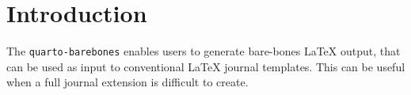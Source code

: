 
\section{Introduction}\label{introduction}

The \texttt{quarto-barebones} enables users to generate bare-bones
{\LaTeX} output, that can be used as input to conventional {\LaTeX}
journal templates. This can be useful when a full journal extension is
difficult to create.

